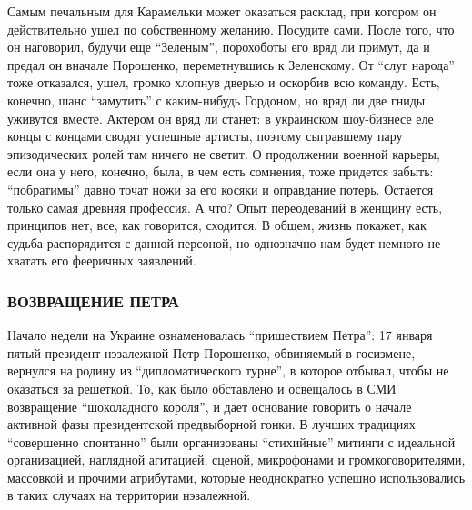 Самым печальным для Карамельки может оказаться расклад, при котором он
действительно ушел по собственному желанию. Посудите сами. После того, что он
наговорил, будучи еще \enquote{Зеленым}, порохоботы его вряд ли примут, да и предал он
вначале Порошенко, переметнувшись к Зеленскому. От \enquote{слуг народа} тоже
отказался, ушел, громко хлопнув дверью и оскорбив всю команду. Есть, конечно,
шанс \enquote{замутить} с каким-нибудь Гордоном, но вряд ли две гниды уживутся вместе.
Актером он вряд ли станет: в украинском шоу-бизнесе еле концы с концами сводят
успешные артисты, поэтому сыгравшему пару эпизодических ролей там ничего не
светит. О продолжении военной карьеры, если она у него, конечно, была, в чем
есть сомнения, тоже придется забыть: \enquote{побратимы} давно точат ножи за его косяки
и оправдание потерь. Остается только самая древняя профессия. А что? Опыт
переодеваний в женщину есть, принципов нет, все, как говорится, сходится. В
общем, жизнь покажет, как судьба распорядится с данной персоной, но однозначно
нам будет немного не хватать его фееричных заявлений.

\subsubsection{ВОЗВРАЩЕНИЕ ПЕТРА}

Начало недели на Украине ознаменовалась \enquote{пришествием Петра}: 17 января
пятый президент нэзалежной Петр Порошенко, обвиняемый в госизмене, вернулся на
родину из \enquote{дипломатического турне}, в которое отбывал, чтобы не
оказаться за решеткой.  То, как было обставлено и освещалось в СМИ возвращение
\enquote{шоколадного короля}, и дает основание говорить о начале активной фазы
президентской предвыборной гонки. В лучших традициях \enquote{совершенно
спонтанно} были организованы \enquote{стихийные} митинги с идеальной
организацией, наглядной агитацией, сценой, микрофонами и громкоговорителями,
массовкой и прочими атрибутами, которые неоднократно успешно использовались в
таких случаях на территории нэзалежной.   

